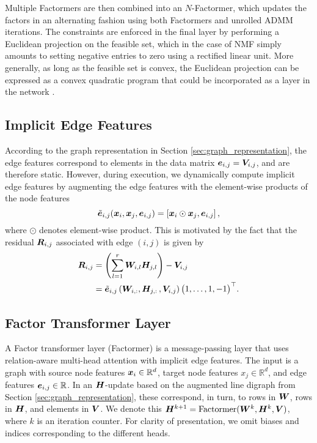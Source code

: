 \documentclass{article}
\begin{document}
Multiple Factormers are then combined into an $N$-Factormer, which updates the factors in an alternating fashion using both Factormers and unrolled ADMM iterations. The constraints are enforced in the final layer by performing a Euclidean projection on the feasible set, which in the case of NMF simply amounts to setting negative entries to zero using a rectified linear unit. More generally, as long as the feasible set is convex, the Euclidean projection can be expressed as a convex quadratic program that could be incorporated as a layer in the network \citep{Agrawal2019}.

\subsection{Implicit Edge Features}
According to the graph representation in Section \ref{sec:graph_representation}, the edge features correspond to elements in the data matrix ${\bm{e}}_{i,j}={\bm{V}}_{i,j}$, and are therefore static. However, during execution, we dynamically compute implicit edge features by augmenting the edge features with the element-wise products of the node features %
\begin{equation}
    \tilde{\ve}_{i,j}(\vx_i, \vx_j, \ve_{i,j}) = %
    \left[\vx_i \odot \vx_j, \ve_{i,j}\right],
    \label{eq:implicit_edge}%
\end{equation}
where $\odot$ denotes element-wise product.
This is motivated by the fact that the residual ${\bm{R}}_{i,j}$ associated with edge $(i,j)$ is given by 
\begin{equation}
    \begin{aligned}
        {\bm{R}}_{i,j} &= \left(\sum_{l=1}^r {\bm{W}}_{i,l}{\bm{H}}_{j,l}\right)-{\bm{V}}_{i,j}\\
                  &= \tilde{{\bm{e}}}_{i,j}\left({\bm{W}}_{i, :}, {\bm{H}}_{j,:}\, , {\bm{V}}_{i,j}\right)\begin{pmatrix}
                      1,\ldots, 1, -1
                  \end{pmatrix}^\top  \!.
    \end{aligned}
\end{equation}

\subsection{Factor Transformer Layer}
A Factor transformer layer (Factormer) is a message-passing layer that uses relation-aware multi-head attention with implicit edge features. The input is a graph with source node features ${\bm{x}}_i\in \mathbb{R}^d$, target node features $x_j\in \mathbb{R}^d$, and edge features ${\bm{e}}_{i,j}\in\mathbb{R}$. In an ${\bm{H}}$-update based on the augmented line digraph from Section \ref{sec:graph_representation}, these correspond, in turn, to rows in ${\bm{W}}$, rows in ${\bm{H}}$, and elements in ${\bm{V}}$. We denote this ${\bm{H}}^{k+1}=\text{Factormer}({\bm{W}}^k, {\bm{H}}^k, {\bm{V}})$, where $k$ is an iteration counter. %
For clarity of presentation, we omit biases and indices corresponding to the different heads.
\end{document}
